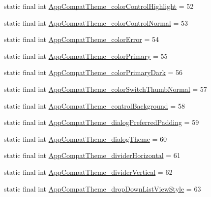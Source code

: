 \begin{DoxyCompactItemize}
\item 
static final int \mbox{\hyperlink{classandroid_1_1support_1_1design_1_1R_1_1styleable_ab90e967a5234f11e88352c2e1d537b67}{App\+Compat\+Theme\+\_\+color\+Control\+Highlight}} = 52
\item 
static final int \mbox{\hyperlink{classandroid_1_1support_1_1design_1_1R_1_1styleable_a64e62e2f99c16432ef0a704f5888208e}{App\+Compat\+Theme\+\_\+color\+Control\+Normal}} = 53
\item 
static final int \mbox{\hyperlink{classandroid_1_1support_1_1design_1_1R_1_1styleable_a6d33a84af081e00a501d60b046e7b26c}{App\+Compat\+Theme\+\_\+color\+Error}} = 54
\item 
static final int \mbox{\hyperlink{classandroid_1_1support_1_1design_1_1R_1_1styleable_aadbffa0cde40a0a96eb461773f8f19e8}{App\+Compat\+Theme\+\_\+color\+Primary}} = 55
\item 
static final int \mbox{\hyperlink{classandroid_1_1support_1_1design_1_1R_1_1styleable_a5e20a3f3a98801e00d114c832a698b2b}{App\+Compat\+Theme\+\_\+color\+Primary\+Dark}} = 56
\item 
static final int \mbox{\hyperlink{classandroid_1_1support_1_1design_1_1R_1_1styleable_a716d45a0bfce470c02a27ffe80e29729}{App\+Compat\+Theme\+\_\+color\+Switch\+Thumb\+Normal}} = 57
\item 
static final int \mbox{\hyperlink{classandroid_1_1support_1_1design_1_1R_1_1styleable_a7a0671fcf24cdc7e14d4e70bd11e54ca}{App\+Compat\+Theme\+\_\+control\+Background}} = 58
\item 
static final int \mbox{\hyperlink{classandroid_1_1support_1_1design_1_1R_1_1styleable_a5670a4513692089b51e1279d930541d6}{App\+Compat\+Theme\+\_\+dialog\+Preferred\+Padding}} = 59
\item 
static final int \mbox{\hyperlink{classandroid_1_1support_1_1design_1_1R_1_1styleable_a21b5a4bac4dc5bcdeabfc9924f1f08fd}{App\+Compat\+Theme\+\_\+dialog\+Theme}} = 60
\item 
static final int \mbox{\hyperlink{classandroid_1_1support_1_1design_1_1R_1_1styleable_a0bdb863059d6bfde1cebce0da32f4271}{App\+Compat\+Theme\+\_\+divider\+Horizontal}} = 61
\item 
static final int \mbox{\hyperlink{classandroid_1_1support_1_1design_1_1R_1_1styleable_a669f031564979a797666db445c79e92a}{App\+Compat\+Theme\+\_\+divider\+Vertical}} = 62
\item 
static final int \mbox{\hyperlink{classandroid_1_1support_1_1design_1_1R_1_1styleable_a0924441ed7135e3db2cec46e35e51e9f}{App\+Compat\+Theme\+\_\+drop\+Down\+List\+View\+Style}} = 63

\end{DoxyCompactItemize}
